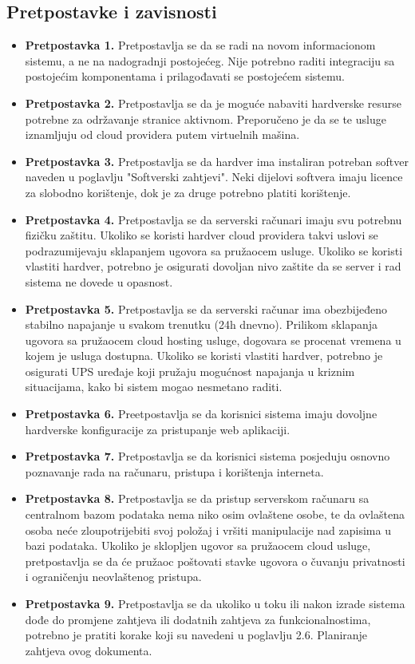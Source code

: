 \subsection{Pretpostavke i zavisnosti}
\begin{itemize}
    \item \textbf{Pretpostavka 1.} Pretpostavlja se da se radi na novom informacionom sistemu, a ne na nadogradnji postojećeg. Nije potrebno raditi integraciju sa postojećim komponentama i prilagođavati se postojećem sistemu.
    \item \textbf{Pretpostavka 2.} Pretpostavlja se da je moguće nabaviti hardverske resurse potrebne za održavanje stranice aktivnom. Preporučeno je da se te usluge iznamljuju od cloud providera putem virtuelnih mašina.
    \item \textbf{Pretpostavka 3.} Pretpostavlja se da hardver ima instaliran potreban softver naveden u poglavlju "Softverski zahtjevi". Neki dijelovi softvera imaju licence za slobodno korištenje, dok je za druge potrebno platiti korištenje.
    \item \textbf{Pretpostavka 4.} Pretpostavlja se da serverski računari imaju svu potrebnu fizičku zaštitu. Ukoliko se koristi hardver cloud providera takvi uslovi se podrazumijevaju sklapanjem ugovora sa pružaocem usluge. Ukoliko se koristi vlastiti hardver, potrebno je osigurati dovoljan nivo zaštite da se server i rad sistema ne dovede u opasnost.
    \item \textbf{Pretpostavka 5.} Pretpostavlja se da serverski računar ima obezbijeđeno stabilno napajanje u svakom trenutku (24h dnevno). Prilikom sklapanja ugovora sa pružaocem cloud hosting usluge, dogovara se procenat vremena u kojem je usluga dostupna. Ukoliko se koristi vlastiti hardver, potrebno je osigurati UPS uređaje koji pružaju mogućnost napajanja u kriznim situacijama, kako bi sistem mogao nesmetano raditi.
    \item \textbf{Pretpostavka 6.} Preetpostavlja se da korisnici sistema imaju dovoljne hardverske konfiguracije za pristupanje web aplikaciji.
    \item \textbf{Pretpostavka 7.} Pretpostavlja se da korisnici sistema posjeduju osnovno poznavanje rada na računaru, pristupa i korištenja interneta.
    \item \textbf{Pretpostavka 8.} Pretpostavlja se da pristup serverskom računaru sa centralnom bazom podataka nema niko osim ovlaštene osobe, te da ovlaštena osoba neće zloupotrijebiti svoj položaj i vršiti manipulacije nad zapisima u bazi podataka. Ukoliko je sklopljen ugovor sa pružaocem cloud usluge, pretpostavlja se da će pružaoc poštovati stavke ugovora o čuvanju privatnosti i ograničenju neovlaštenog pristupa.
    \item \textbf{Pretpostavka 9.} Pretpostavlja se da ukoliko u toku ili nakon izrade sistema dođe do promjene zahtjeva ili dodatnih zahtjeva za funkcionalnostima, potrebno je pratiti korake koji su navedeni u poglavlju 2.6. Planiranje zahtjeva ovog dokumenta.
\end{itemize}
